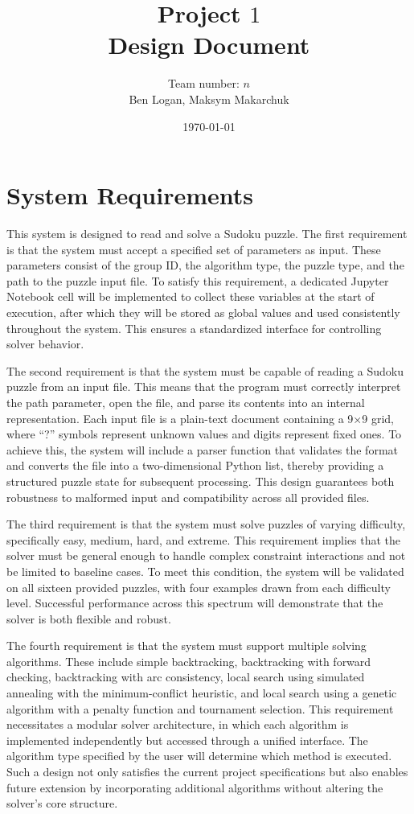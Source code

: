 \documentclass[12pt]{article}
\title{Project $1$ \\ Design Document}
\author{Team number: $n$ \\ Ben Logan, Maksym Makarchuk}
\date{\today}
\begin{document}
\maketitle

\section{System Requirements}
This system is designed to read and solve a Sudoku puzzle. 
The first requirement is that the system must accept a specified 
set of parameters as input. These parameters consist of the group 
ID, the algorithm type, the puzzle type, and the path to the puzzle 
input file. To satisfy this requirement, a dedicated Jupyter Notebook 
cell will be implemented to collect these variables at the start of 
execution, after which they will be stored as global values and used 
consistently throughout the system. This ensures a standardized interface 
for controlling solver behavior.

The second requirement is that the system must be capable of reading 
a Sudoku puzzle from an input file. This means that the program must 
correctly interpret the path parameter, open the file, and parse its 
contents into an internal representation. Each input file is a plain-text 
document containing a 9×9 grid, where “?” symbols represent unknown 
values and digits represent fixed ones. To achieve this, the system will 
include a parser function that validates the format and converts the 
file into a two-dimensional Python list, thereby providing a structured 
puzzle state for subsequent processing. This design guarantees both 
robustness to malformed input and compatibility across all provided files.

The third requirement is that the system must solve puzzles of varying 
difficulty, specifically easy, medium, hard, and extreme. This requirement 
implies that the solver must be general enough to handle complex constraint 
interactions and not be limited to baseline cases. To meet this condition, 
the system will be validated on all sixteen provided puzzles, with four 
examples drawn from each difficulty level. Successful performance across 
this spectrum will demonstrate that the solver is both flexible and robust.

The fourth requirement is that the system must support multiple solving 
algorithms. These include simple backtracking, backtracking with forward 
checking, backtracking with arc consistency, local search using simulated 
annealing with the minimum-conflict heuristic, and local search using a 
genetic algorithm with a penalty function and tournament selection. This 
requirement necessitates a modular solver architecture, in which each 
algorithm is implemented independently but accessed through a unified 
interface. The algorithm type specified by the user will determine which 
method is executed. Such a design not only satisfies the current project 
specifications but also enables future extension by incorporating additional 
algorithms without altering the solver’s core structure.
\end{document}
